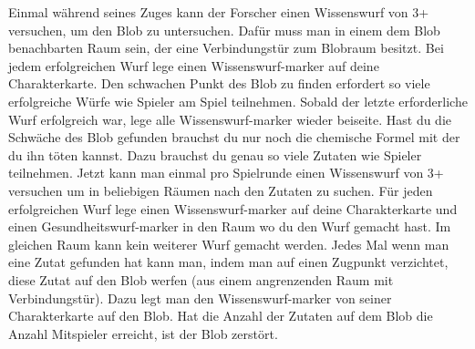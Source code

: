 \begin{itemize}
    \bitem Einmal während seines Zuges kann der Forscher einen Wissenswurf von 3+ versuchen, um den Blob zu untersuchen. Dafür muss man in einem dem Blob benachbarten Raum sein, der eine Verbindungstür zum Blobraum besitzt. Bei jedem erfolgreichen Wurf lege einen Wissenswurf-marker auf deine Charakterkarte.
    \newpage
    \bitem Den schwachen Punkt des Blob zu finden erfordert so viele erfolgreiche Würfe wie Spieler am Spiel teilnehmen. Sobald der letzte erforderliche Wurf erfolgreich war, lege alle Wissenswurf-marker wieder beiseite.
    \bitem Hast du die Schwäche des Blob gefunden brauchst du nur noch die chemische Formel mit der du ihn töten kannst. Dazu brauchst du genau so viele Zutaten wie Spieler teilnehmen. Jetzt kann man einmal pro Spielrunde einen Wissenswurf von 3+ versuchen um in beliebigen Räumen nach den Zutaten zu suchen. Für jeden erfolgreichen Wurf lege einen Wissenswurf-marker auf deine Charakterkarte und einen Gesundheitswurf-marker in den Raum wo du den Wurf gemacht hast. Im gleichen Raum kann kein weiterer Wurf gemacht werden.
    \bitem Jedes Mal wenn man eine Zutat gefunden hat kann man, indem man auf einen Zugpunkt verzichtet, diese Zutat auf den Blob werfen (aus einem angrenzenden Raum mit Verbindungstür). Dazu legt man den Wissenswurf-marker von seiner Charakterkarte auf den Blob. Hat die Anzahl der Zutaten auf dem Blob die Anzahl Mitspieler erreicht, ist der Blob zerstört.
\end{itemize}

